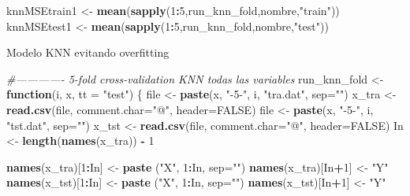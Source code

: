 \documentclass[
]{article}
\newenvironment{Shaded}{\begin{snugshade}}{\end{snugshade}}
\newcommand{\CommentTok}[1]{\textcolor[rgb]{0.56,0.35,0.01}{\textit{#1}}}
\newcommand{\ControlFlowTok}[1]{\textcolor[rgb]{0.13,0.29,0.53}{\textbf{#1}}}
\newcommand{\DataTypeTok}[1]{\textcolor[rgb]{0.13,0.29,0.53}{#1}}
\newcommand{\DecValTok}[1]{\textcolor[rgb]{0.00,0.00,0.81}{#1}}
\newcommand{\KeywordTok}[1]{\textcolor[rgb]{0.13,0.29,0.53}{\textbf{#1}}}
\newcommand{\NormalTok}[1]{#1}
\newcommand{\OperatorTok}[1]{\textcolor[rgb]{0.81,0.36,0.00}{\textbf{#1}}}
\newcommand{\OtherTok}[1]{\textcolor[rgb]{0.56,0.35,0.01}{#1}}
\newcommand{\StringTok}[1]{\textcolor[rgb]{0.31,0.60,0.02}{#1}}
\begin{document}
\begin{Shaded}
\begin{Highlighting}[]
\NormalTok{knnMSEtrain1 <-}\StringTok{ }\KeywordTok{mean}\NormalTok{(}\KeywordTok{sapply}\NormalTok{(}\DecValTok{1}\OperatorTok{:}\DecValTok{5}\NormalTok{,run_knn_fold,nombre,}\StringTok{"train"}\NormalTok{))}
\NormalTok{knnMSEtest1 <-}\StringTok{ }\KeywordTok{mean}\NormalTok{(}\KeywordTok{sapply}\NormalTok{(}\DecValTok{1}\OperatorTok{:}\DecValTok{5}\NormalTok{,run_knn_fold,nombre,}\StringTok{"test"}\NormalTok{))}
\end{Highlighting}
\end{Shaded}

Modelo KNN evitando overfitting

\begin{Shaded}
\begin{Highlighting}[]
\CommentTok{#------------- 5-fold cross-validation KNN todas las variables}
\NormalTok{run_knn_fold <-}\StringTok{ }\ControlFlowTok{function}\NormalTok{(i, x, }\DataTypeTok{tt =} \StringTok{"test"}\NormalTok{) \{}
\NormalTok{    file <-}\StringTok{ }\KeywordTok{paste}\NormalTok{(x, }\StringTok{"-5-"}\NormalTok{, i, }\StringTok{"tra.dat"}\NormalTok{, }\DataTypeTok{sep=}\StringTok{""}\NormalTok{)}
\NormalTok{    x_tra <-}\StringTok{ }\KeywordTok{read.csv}\NormalTok{(file, }\DataTypeTok{comment.char=}\StringTok{"@"}\NormalTok{, }\DataTypeTok{header=}\OtherTok{FALSE}\NormalTok{)}
\NormalTok{    file <-}\StringTok{ }\KeywordTok{paste}\NormalTok{(x, }\StringTok{"-5-"}\NormalTok{, i, }\StringTok{"tst.dat"}\NormalTok{, }\DataTypeTok{sep=}\StringTok{""}\NormalTok{)}
\NormalTok{    x_tst <-}\StringTok{ }\KeywordTok{read.csv}\NormalTok{(file, }\DataTypeTok{comment.char=}\StringTok{"@"}\NormalTok{, }\DataTypeTok{header=}\OtherTok{FALSE}\NormalTok{)}
\NormalTok{    In <-}\StringTok{ }\KeywordTok{length}\NormalTok{(}\KeywordTok{names}\NormalTok{(x_tra)) }\OperatorTok{-}\StringTok{ }\DecValTok{1}
    
    \KeywordTok{names}\NormalTok{(x_tra)[}\DecValTok{1}\OperatorTok{:}\NormalTok{In] <-}\StringTok{ }\KeywordTok{paste}\NormalTok{ (}\StringTok{"X"}\NormalTok{, }\DecValTok{1}\OperatorTok{:}\NormalTok{In, }\DataTypeTok{sep=}\StringTok{""}\NormalTok{)}
    \KeywordTok{names}\NormalTok{(x_tra)[In}\OperatorTok{+}\DecValTok{1}\NormalTok{] <-}\StringTok{ "Y"}
    \KeywordTok{names}\NormalTok{(x_tst)[}\DecValTok{1}\OperatorTok{:}\NormalTok{In] <-}\StringTok{ }\KeywordTok{paste}\NormalTok{ (}\StringTok{"X"}\NormalTok{, }\DecValTok{1}\OperatorTok{:}\NormalTok{In, }\DataTypeTok{sep=}\StringTok{""}\NormalTok{)}
    \KeywordTok{names}\NormalTok{(x_tst)[In}\OperatorTok{+}\DecValTok{1}\NormalTok{] <-}\StringTok{ "Y"}
    

\end{Highlighting}
\end{Shaded}
\end{document}

